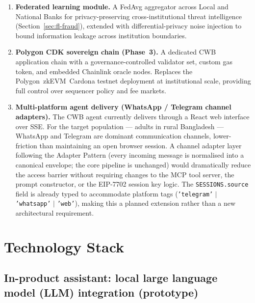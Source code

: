 \documentclass[12pt,a4paper]{report}
\begin{document}
\begin{enumerate}[noitemsep]
\item \textbf{Federated learning module.} A FedAvg aggregator across Local and National Banks for privacy-preserving cross-institutional threat intelligence (Section~\ref{sec:fl-fraud}), extended with differential-privacy noise injection to bound information leakage across institution boundaries.

\item \textbf{Polygon CDK sovereign chain (Phase~3).} A dedicated CWB application chain with a governance-controlled validator set, custom gas token, and embedded Chainlink oracle nodes. Replaces the Polygon~zkEVM~Cardona testnet deployment at institutional scale, providing full control over sequencer policy and fee markets.

\item \textbf{Multi-platform agent delivery (WhatsApp / Telegram channel adapters).}
The CWB agent currently delivers through a React web interface over SSE. For the
target population --- adults in rural Bangladesh --- WhatsApp and Telegram are
dominant communication channels, lower-friction than maintaining an open browser
session. A channel adapter layer following the Adapter Pattern (every incoming
message is normalised into a canonical envelope; the core pipeline is unchanged)
would dramatically reduce the access barrier without requiring changes to the MCP
tool server, the prompt constructor, or the EIP-7702 session key logic. The
\texttt{SESSIONS.source} field is already typed to accommodate platform tags
(\texttt{'telegram'} $|$ \texttt{'whatsapp'} $|$ \texttt{'web'}), making this a
planned extension rather than a new architectural requirement.

\end{enumerate}


\appendix

\chapter{Technology Stack}

\section{In-product assistant: local large language model (LLM) integration (prototype)}
\end{document}
